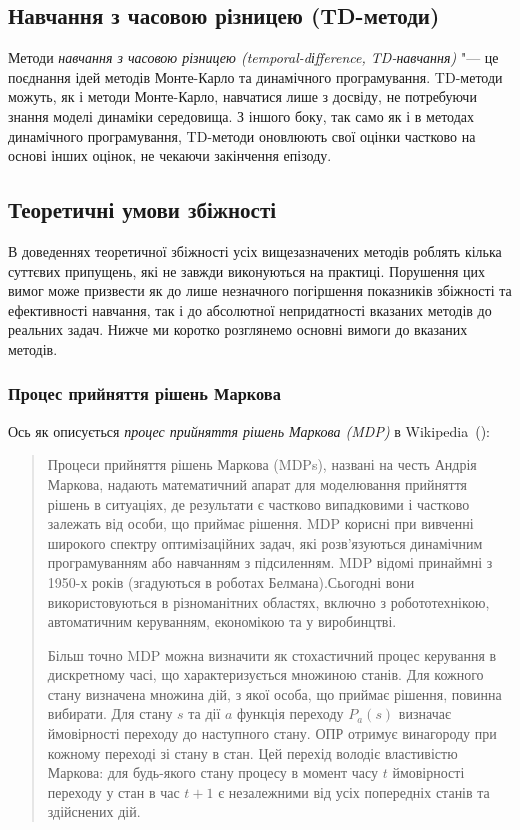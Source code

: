 \documentclass[a4paper,10pt,fleqn,draft]{article}
\begin{document}
\subsection{Навчання з часовою різницею (TD-методи)}

Методи \emph{навчання з часовою різницею (temporal-dіfference, TD-навчання)} "--- це поєднання ідей методів Монте-Карло та динамічного програмування. TD-методи можуть, як і методи Монте-Карло, навчатися лише з досвіду, не потребуючи знання моделі динаміки середовища. З іншого боку, так само як і в методах динамічного програмування, TD-методи оновлюють свої оцінки частково на основі інших оцінок, не чекаючи закінчення епізоду.

\subsection{Теоретичні умови збіжності}

В доведеннях теоретичної збіжності усіх вищезазначених методів роблять кілька суттєвих припущень, які не завжди виконуються на практиці. Порушення цих вимог може призвести як до лише незначного погіршення показників збіжності та ефективності навчання, так і до абсолютної непридатності вказаних методів до реальних задач. Нижче ми коротко розглянемо основні вимоги до вказаних методів.

\subsubsection{Процес прийняття рішень Маркова}

Ось як описується \emph{процес прийняття рішень Маркова (MDP)} в Wikipedia~(\cite{WikiMDP}):
\begin{quotation}
	Процеси прийняття рішень Маркова (MDPs), названі на честь Андрія Маркова, надають математичний апарат для моделювання прийняття рішень в ситуаціях, де результати є частково випадковими і частково залежать від особи, що приймає рішення. MDP корисні при вивченні широкого спектру оптимізаційних задач, які розв'язуються динамічним програмуванням або навчанням з підсиленням. MDP відомі принаймні з 1950-х років (згадуються в роботах Белмана).Сьогодні вони використовуються в різноманітних областях, включно з робототехнікою, автоматичним керуванням, економікою та у виробинцтві.

	Більш точно MDP можна визначити як стохастичний процес керування в дискретному часі, що характеризується множиною станів. Для кожного стану визначена множина дій, з якої особа, що приймає рішення, повинна вибирати. Для стану $s$ та дії $a$ функція переходу $P_a(s)$ визначає ймовірності переходу до наступного стану. ОПР отримує винагороду при кожному переході зі стану в стан. Цей перехід володіє властивістю Маркова: для будь-якого стану процесу в момент часу $t$ ймовірності переходу у стан в час $t+1$ є незалежними від усіх попередніх станів та здійснених дій.
\end{quotation}
\end{document}
